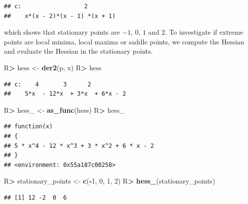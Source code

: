 \documentclass[10pt,]{article}
\newenvironment{Shaded}{\begin{snugshade}}{\end{snugshade}}
\newcommand{\DecValTok}[1]{\textcolor[rgb]{0.00,0.00,0.81}{#1}}
\newcommand{\KeywordTok}[1]{\textcolor[rgb]{0.13,0.29,0.53}{\textbf{#1}}}
\newcommand{\NormalTok}[1]{#1}
\newcommand{\OperatorTok}[1]{\textcolor[rgb]{0.81,0.36,0.00}{\textbf{#1}}}
\newcommand{\StringTok}[1]{\textcolor[rgb]{0.31,0.60,0.02}{#1}}
\begin{document}
\begin{verbatim}
## c:                  2        
##    x*(x - 2)*(x - 1) *(x + 1)
\end{verbatim}

which shows that stationary points are \(-1\), \(0\), \(1\) and \(2\).
To investigate if extreme points are local minima, local maxima or
saddle points, we compute the Hessian and evaluate the Hessian in the
stationary points.

\begin{Shaded}
\begin{Highlighting}[]
\NormalTok{R}\OperatorTok{>}\StringTok{ }\NormalTok{hess <-}\StringTok{ }\KeywordTok{der2}\NormalTok{(p, x)}
\NormalTok{R}\OperatorTok{>}\StringTok{ }\NormalTok{hess}
\end{Highlighting}
\end{Shaded}

\begin{verbatim}
## c:    4       3      2          
##    5*x  - 12*x  + 3*x  + 6*x - 2
\end{verbatim}

\begin{Shaded}
\begin{Highlighting}[]
\NormalTok{R}\OperatorTok{>}\StringTok{ }\NormalTok{hess_ <-}\StringTok{ }\KeywordTok{as_func}\NormalTok{(hess)}
\NormalTok{R}\OperatorTok{>}\StringTok{ }\NormalTok{hess_}
\end{Highlighting}
\end{Shaded}

\begin{verbatim}
## function(x)
## { 
## 5 * x^4 - 12 * x^3 + 3 * x^2 + 6 * x - 2
## }
## <environment: 0x55a187c00258>
\end{verbatim}

\begin{Shaded}
\begin{Highlighting}[]
\NormalTok{R}\OperatorTok{>}\StringTok{ }\NormalTok{stationary_points <-}\StringTok{ }\KeywordTok{c}\NormalTok{(}\OperatorTok{-}\DecValTok{1}\NormalTok{, }\DecValTok{0}\NormalTok{, }\DecValTok{1}\NormalTok{, }\DecValTok{2}\NormalTok{)}
\NormalTok{R}\OperatorTok{>}\StringTok{ }\KeywordTok{hess_}\NormalTok{(stationary_points)}
\end{Highlighting}
\end{Shaded}

\begin{verbatim}
## [1] 12 -2  0  6
\end{verbatim}
\end{document}
